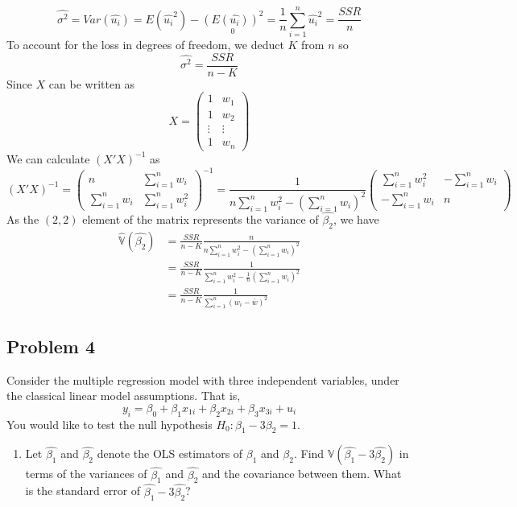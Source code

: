 \documentclass[12pt]{article}
\begin{document}
\begin{flushleft}
\begin{enumerate}
\[
\hat{\sigma^2}=Var(\hat{u_i})=E(\hat{u_i}^2)-\underset{0}{(E(\hat{u_i}))^2}=\frac{1}{n}\sum_{i=1}^n\hat{u_i}^2=\frac{SSR}{n}
\]
To account for the loss in degrees of freedom, we deduct $K$ from $n$ so 
\[
\hat{\sigma^2}=\frac{SSR}{n-K}
\]
Since $X$ can be written as
\[
X=\begin{pmatrix} 1 & w_1 \\ 1 & w_2 \\ \vdots & \vdots \\ 1 & w_n \end{pmatrix}
\]
We can calculate $(X'X)^{-1}$ as
\[
(X'X)^{-1}=\begin{pmatrix} n & \sum_{i=1}^n w_i \\ \sum_{i=1}^n w_i & \sum_{i=1}^n w_i^2 \end{pmatrix}^{-1}=\frac{1}{n\sum_{i=1}^n w_i^2-\left(\sum_{i=1}^n w_i\right)^2}\begin{pmatrix} \sum_{i=1}^n w_i^2 & -\sum_{i=1}^n w_i \\ -\sum_{i=1}^n w_i & n \end{pmatrix}
\]
As the $(2,2)$ element of the matrix represents the variance of $\hat{\beta_2}$, we have
\begin{align*}
    \hat{\mathbb{V}}(\hat{\beta_2})&=\frac{SSR}{n-K}\frac{n}{n\sum_{i=1}^n w_i^2-\left(\sum_{i=1}^n w_i\right)^2}\\&=\frac{SSR}{n-K}\frac{1}{\sum_{i=1}^n w_i^2-\frac{1}{n}\left(\sum_{i=1}^n w_i\right)^2}\\&=\frac{SSR}{n-K}\frac{1}{\sum_{i=1}^n(w_i-\bar{w})^2}
\end{align*}


\end{enumerate}
\subsection*{Problem 4}
Consider the multiple regression model with three independent variables, under the classical linear model assumptions. That is,
\[
y_i=\beta_0+\beta_1x_{1i}+\beta_2x_{2i}+\beta_3x_{3i}+u_i
\]
You would like to test the null hypothesis $H_0:\beta_1-3\beta_2=1$.\\
\begin{enumerate}
    \item Let $\hat{\beta_1}$ and $\hat{\beta_2}$ denote the OLS estimators of $\beta_1$ and $\beta_2$. Find $\mathbb{V}(\hat{\beta_1}-3\hat{\beta_2})$ in terms of the variances of $\hat{\beta_1}$ and $\hat{\beta_2}$ and the covariance between them. What is the standard error of $\hat{\beta_1}-3\hat{\beta_2}$?\\
 

\end{enumerate}
\end{flushleft}
\end{document}
